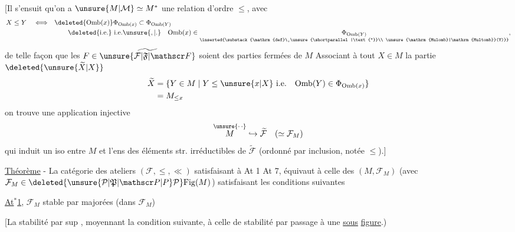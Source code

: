 [Il s'ensuit qu'on a  $\unsure{M|\mathcal M}\simeq M^{*}$ une relation d'ordre $\leq$, avec
\[
\begin{aligned}
 X\leq Y\quad\Longleftrightarrow\quad&
 \deleted{\mathrm{Omb}(x)}\Phi_{\mathrm{Omb}(x)}
 \subset\Phi_{\mathrm{Omb}(Y)}\\
 &\qquad\deleted{\text{i.e.}}\ \text{i.e.}\unsure{,|.}\quad
 \mathrm{Omb}(x)\in
 \underset{\inserted{\substack{\mathrm{def}\ \unsure{\shortparallel|\text{''}}\\
 \unsure{\mathrm{Mulomb}|\mathrm{Multomb}}(Y)}}}{\Phi_{\mathrm{Omb}(Y)}},
\end{aligned}
\]
de telle façon que les  $F\in\widetilde{\unsure{\mathcal F|\mathfrak F|\mathscr F}}$ soient des parties fermées de $M$
Associant à tout $X\in M$ la partie $\deleted{\unsure{\widetilde X|X}}$
\[
\begin{aligned}
 \widetilde X&=\{Y\in M\mid Y\leq\unsure{x|X}\ \text{i.e.}\quad
 \mathrm{Omb}(Y)\in\Phi_{\mathrm{Omb}(x)}\}\\
 &=M_{\leq x}
\end{aligned}
\]
on trouve une application injective
\[
 \overset{\unsure{\cdot\,\cdot}}{M}\hookrightarrow\widetilde{\mathcal F}\quad(\simeq\mathcal F_M)
\]
qui induit un iso entre $M$ et l'ens des éléments str. irréductibles de $\widetilde{\mathcal F}$ (ordonné par inclusion, notée $\leq$).]


\uline{Théorème} - \quad La catégorie  des  ateliers $(\mathcal F,\leq,\ll)$ satisfaisant à At 1  At 7, équivaut à celle des $(M,\mathcal F_M)$ (avec $\mathcal F_M\in\deleted{\unsure{\mathcal P|\mathfrak P|\mathscr P|P}\mathcal P}\mathrm{Fig}(M)$) satisfaisant les conditions suivantes

\uline{At$^{*}$1}, $\mathcal F_M$   stable par   majorées (dans $\mathcal F_M$)

 [La stabilité par sup , moyennant la condition suivante, à celle de  stabilité par passage à une \uline{sous}  \uline{figure}.)
